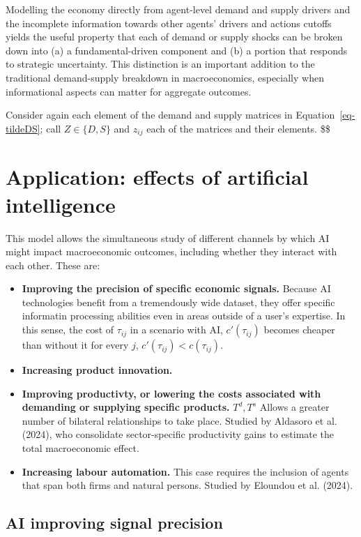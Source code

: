 \documentclass[
]{article}
\theoremstyle{plain}
\theoremstyle{definition}
\theoremstyle{remark}
\begin{document}
Modelling the economy directly from agent-level demand and supply
drivers and the incomplete information towards other agents' drivers and
actions cutoffs yields the useful property that each of demand or supply
shocks can be broken down into (a) a fundamental-driven component and
(b) a portion that responds to strategic uncertainty. This distinction
is an important addition to the traditional demand-supply breakdown in
macroeconomics, especially when informational aspects can matter for
aggregate outcomes.

Consider again each element of the demand and supply matrices in
Equation~\ref{eq-tildeDS}; call \(Z \in \{D, S\}\) and \(z_{ij}\) each
of the matrices and their elements. \$\$

\section{Application: effects of artificial intelligence}\label{sec-AI}

This model allows the simultaneous study of different channels by which
AI might impact macroeconomic outcomes, including whether they interact
with each other. These are:

\begin{itemize}
\item
  \textbf{Improving the precision of specific economic signals.} Because
  AI technologies benefit from a tremendously wide dataset, they offer
  specific informatin processing abilities even in areas outside of a
  user's expertise. In this sense, the cost of \(\tau_{ij}\) in a
  scenario with AI, \(c'(\tau_{ij})\) becomes cheaper than without it
  for every \(j\), \(c'(\tau_{ij}) < c(\tau_{ij})\).
\item
  \textbf{Increasing product innovation.}
\item
  \textbf{Improving productivty, or lowering the costs associated with
  demanding or supplying specific products.} \(T^d, T^s\) Allows a
  greater number of bilateral relationships to take place. Studied by
  Aldasoro et al. (2024), who consolidate sector-specific productivity
  gains to estimate the total macroeconomic effect.
\item
  \textbf{Increasing labour automation.} This case requires the
  inclusion of agents that span both firms and natural persons. Studied
  by Eloundou et al. (2024).
\end{itemize}

\subsection{AI improving signal
precision}\label{ai-improving-signal-precision}
\end{document}
